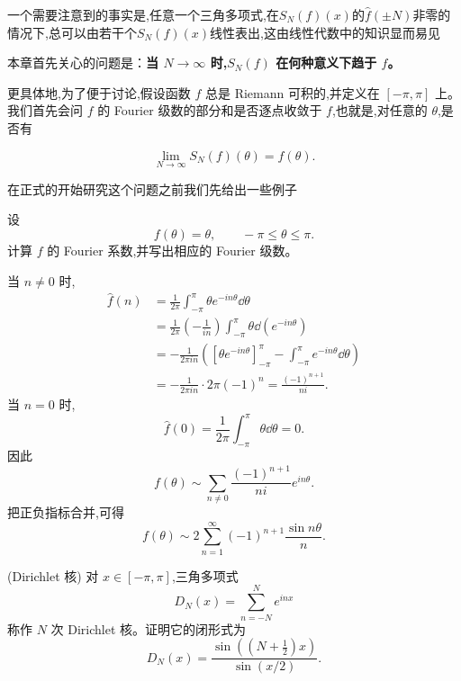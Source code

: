 一个需要注意到的事实是,任意一个三角多项式,在$S_N(f)(x)$的$\widehat f(\pm N)$非零的情况下,总可以由若干个$S_N(f)(x)$线性表出,这由线性代数中的知识显而易见


本章首先关心的问题是：\textbf{当 $N\to\infty$ 时,$S_N(f)$ 在何种意义下趋于 $f$。}

更具体地,为了便于讨论,假设函数 $f$ 总是 Riemann 可积的,并定义在 $[-\pi,\pi]$ 上。我们首先会问 $f$ 的 Fourier 级数的部分和是否逐点收敛于 $f$,也就是,对任意的 $\theta$,是否有

	\[\lim_{N\to\infty}S_N(f)(\theta)=f(\theta).\]

在正式的开始研究这个问题之前我们先给出一些例子


\begin{example}
	设
	\[
	f(\theta)=\theta,
	\qquad -\pi\leq\theta\leq\pi.
	\]
	计算 $f$ 的 Fourier 系数,并写出相应的 Fourier 级数。
\end{example}

\begin{solution}
	当 $n\neq0$ 时,
	\[
	\begin{aligned}
		\widehat f(n)
		&=\frac1{2\pi}\int_{-\pi}^{\pi}\theta e^{-in\theta}\dd\theta                                      \\
		&=\frac1{2\pi}\left(-\frac1{in}\right)
		\int_{-\pi}^{\pi}\theta\dd(e^{-in\theta})                                      \\
		&=-\frac1{2\pi in}
		\left(\left[\theta e^{-in\theta}\right]_{-\pi}^{\pi}
		-\int_{-\pi}^{\pi}e^{-in\theta}\dd\theta\right)                                  \\
		&=-\frac1{2\pi in}\cdot 2\pi(-1)^n
		=\frac{(-1)^{n+1}}{ni}.
	\end{aligned}
	\]
	当 $n=0$ 时,
	\[
	\widehat f(0)=\frac1{2\pi}\int_{-\pi}^{\pi}\theta\dd\theta=0.
	\]
	因此
	\[
	f(\theta)
	\sim \sum_{n\neq0}\frac{(-1)^{n+1}}{ni}e^{in\theta}.
	\]
	把正负指标合并,可得
	\[
	f(\theta)
	\sim 2\sum_{n=1}^{\infty}(-1)^{n+1}\frac{\sin n\theta}{n}.
	\]
\end{solution}

\begin{example}(Dirichlet 核)
	对 $x\in[-\pi,\pi]$,三角多项式
	\[
	D_N(x)=\sum_{n=-N}^{N}e^{inx}
	\]
	称作 $N$ 次 Dirichlet 核。证明它的闭形式为
	\[
	D_N(x)=\frac{\sin\left((N+\frac12)x\right)}{\sin(x/2)}.
	\]
\end{example}

